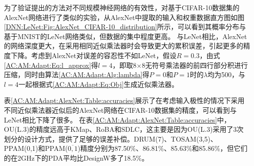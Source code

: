为了验证提出的方法对不同规模神经网络的有效性，对基于CIFAR-10数据集\cite{DNN:CIFAR-10}的AlexNet网络\cite{DNN:AlexNet}进行了类似的实验，从AlexNet中提取的输入和权重数据直方图如图\ref{DNN:LeNet:Fig:AlexNet_CIFAR-10_distribution}所示，可以看到其概率分布与基于MNIST的LeNet网络类似\cite{DNN:LeNet_MNIST}，但数据的集中程度更高。
与LeNet相比，AlexNet的网络深度更大，在采用相同近似乘法器时会导致更大的累积误差，引起更多的精度下降。考虑到AlexNet对误差的容忍性不如LeNet，假设$R=0.3$，由式\eqref{AC:AM:Adapt:Eq:l_approx}得$l=4$，即取8$\times$8无符号乘法器的前四行部分积进行压缩，同时由算法\ref{AC:AM:Adapt:Alg:lambda}得$P=0$和$P=1$时的$\lambda$均为500，与$l=4$一起根据式\eqref{AC:AM:Adapt:Eq:Obj}生成近似乘法器。

\begin{table}
    \renewcommand{\arraystretch}{1.3}
    \setlength\tabcolsep{3.76pt}
    \caption{采用不同近似乘法器近似后的AlexNet网络在CIFAR-10数据集的精度}
    \label{AC:AM:Adapt:AlexNet:Table:accuracies}
    \centering
\end{table}


表\ref{AC:AM:Adapt:AlexNet:Table:accuracies}展示了在考虑输入极性的情况下采用不同近似乘法器近似后的AlexNet网络在CIFAR-10数据集的精度，可以看到与LeNet相比下降了很多。
在表\ref{AC:AM:Adapt:AlexNet:Table:accuracies}中，OU(L.3)的精度远高于KMap、RoBA和SDLC，这主要是因为OU(L.3)采用了3次划分的设计方式，提供了足够的误差补偿。DRUM(7)、TOSAM(3,5)、PPAM(0,1)和PPAM($\overline{0,1}$)精度分别为87.50\%、86.81\%、85.63\%和85.86\%，但它们的在2GHz下的PDA平均比DesignW多了18.5\%。

